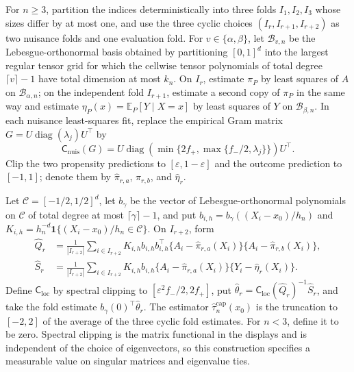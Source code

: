 For \(n\geq3\), partition the indices deterministically into three folds \(I_1,I_2,I_3\) whose sizes differ by at most one, and use the three cyclic choices \((I_{r},I_{r+1},I_{r+2})\) as two nuisance folds and one evaluation fold.  For \(v\in\{\alpha,\beta\}\), let \(\mathcal B_{v,n}\) be the Lebesgue-orthonormal basis obtained by partitioning \([0,1]^d\) into the largest regular tensor grid for which the cellwise tensor polynomials of total degree \(\lceil v\rceil-1\) have total dimension at most \(k_n\).  On \(I_r\), estimate \(\pi_P\) by least squares of \(A\) on \(\mathcal B_{\alpha,n}\); on the independent fold \(I_{r+1}\), estimate a second copy of \(\pi_P\) in the same way and estimate \(\eta_P(x)=\mathbb E_P[Y\mid X=x]\) by least squares of \(Y\) on \(\mathcal B_{\beta,n}\).  In each nuisance least-squares fit, replace the empirical Gram matrix \(G=U\operatorname{diag}(\lambda_j)U^\top\) by
\[
\mathsf C_{\mathrm{nuis}}(G)=U\operatorname{diag}\!\left(\min\{2f_+,\max\{f_-/2,\lambda_j\}\}\right)U^\top.
\]
Clip the two propensity predictions to \([\varepsilon,1-\varepsilon]\) and the outcome prediction to \([-1,1]\); denote them by \(\widehat\pi_{r,a}\), \(\widehat\pi_{r,b}\), and \(\widehat\eta_r\).

Let \(\mathcal C=[-1/2,1/2]^d\), let \(b_\gamma\) be the vector of Lebesgue-orthonormal polynomials on \(\mathcal C\) of total degree at most \(\lceil\gamma\rceil-1\), and put \(b_{i,h}=b_\gamma((X_i-x_0)/h_n)\) and \(K_{i,h}=h_n^{-d}\mathbf1\{(X_i-x_0)/h_n\in\mathcal C\}\).  On \(I_{r+2}\), form
\[
\begin{aligned}
\widehat Q_r&=\frac1{|I_{r+2}|}\sum_{i\in I_{r+2}}K_{i,h}b_{i,h}b_{i,h}^\top
\{A_i-\widehat\pi_{r,a}(X_i)\}\{A_i-\widehat\pi_{r,b}(X_i)\},\\
\widehat S_r&=\frac1{|I_{r+2}|}\sum_{i\in I_{r+2}}K_{i,h}b_{i,h}
\{A_i-\widehat\pi_{r,a}(X_i)\}\{Y_i-\widehat\eta_r(X_i)\}.
\end{aligned}
\]
Define \(\mathsf C_{\mathrm{loc}}\) by spectral clipping to
\([\varepsilon^2f_-/2,2f_+]\), put
\(\widehat\theta_r=\mathsf C_{\mathrm{loc}}(\widehat Q_r)^{-1}\widehat S_r\),
and take the fold estimate \(b_\gamma(0)^\top\widehat\theta_r\).  The estimator
\(\widehat\tau_n^{\mathrm{cap}}(x_0)\) is the truncation to \([-2,2]\) of the average of the three cyclic fold estimates.  For \(n<3\), define it to be zero.  Spectral clipping is the matrix functional in the displays and is independent of the choice of eigenvectors, so this construction specifies a measurable value on singular matrices and eigenvalue ties.